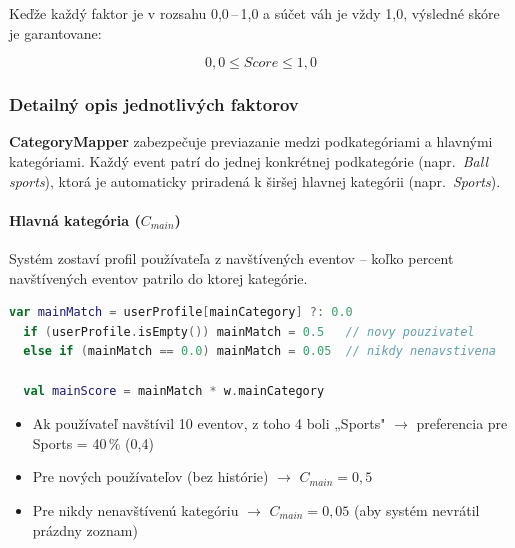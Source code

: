   Keďže každý faktor je v rozsahu 0,0\,--\,1,0 a súčet váh je vždy 1,0,
  výsledné skóre je garantovane:

  \begin{equation}
  0{,}0 \leq Score \leq 1{,}0
  \end{equation}

  \subsubsection{Detailný opis jednotlivých faktorov}

  \textbf{CategoryMapper} zabezpečuje previazanie medzi podkategóriami
  a hlavnými kategóriami. Každý event patrí do jednej konkrétnej podkategórie
  (napr.\ \textit{Ball sports}), ktorá je automaticky priradená k širšej
  hlavnej kategórii (napr.\ \textit{Sports}).

  \paragraph{Hlavná kategória ($C_{main}$)}

  Systém zostaví profil používateľa z navštívených eventov -- koľko percent
  navštívených eventov patrilo do ktorej kategórie.

  \begin{lstlisting}[language=Kotlin, caption=Výpočet skóre hlavnej kategórie]
  var mainMatch = userProfile[mainCategory] ?: 0.0
  if (userProfile.isEmpty()) mainMatch = 0.5   // novy pouzivatel
  else if (mainMatch == 0.0) mainMatch = 0.05  // nikdy nenavstivena

  val mainScore = mainMatch * w.mainCategory
  \end{lstlisting}

  \begin{itemize}
      \item Ak používateľ navštívil 10 eventov, z toho 4 boli „Sports"
            $\rightarrow$ preferencia pre Sports = 40\,\% (0,4)
      \item Pre nových používateľov (bez histórie) $\rightarrow$ $C_{main} = 0{,}5$                                                                                                                                                 
      \item Pre nikdy nenavštívenú kategóriu $\rightarrow$ $C_{main} = 0{,}05$                                                                                                                                                      
            (aby systém nevrátil prázdny zoznam)
  \end{itemize}

